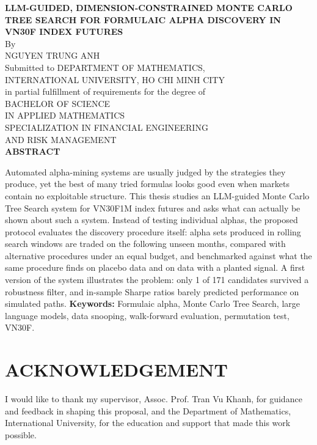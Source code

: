 \documentclass[12pt,a4paper,oneside]{book}
\theoremstyle{definition}
\newcommand{\thesistitle}{LLM-GUIDED, DIMENSION-CONSTRAINED MONTE CARLO TREE SEARCH FOR FORMULAIC ALPHA DISCOVERY IN VN30F INDEX FUTURES}
\newcommand{\studentname}{NGUYEN TRUNG ANH}
\begin{document}
	\newpage
	\thispagestyle{plain}
	\begin{center}
		\large\textbf{\thesistitle} \\
		\normalsize{By}\\
		\large{\studentname}\\
		\vskip10mm
		\normalsize{Submitted to DEPARTMENT OF MATHEMATICS,\\INTERNATIONAL UNIVERSITY, HO CHI MINH CITY\\ in partial fulfillment of requirements for the degree of\\
			BACHELOR OF SCIENCE \\
			IN APPLIED MATHEMATICS \\
			SPECIALIZATION IN FINANCIAL ENGINEERING  \\
			AND RISK MANAGEMENT}\\
		\vspace*{0.5cm}
	\large\textbf{ABSTRACT}\\
	\end{center}
	\vskip2mm
Automated alpha-mining systems are usually judged by the strategies they produce, yet the best of many tried formulas looks good even when markets contain no exploitable structure. This thesis studies an LLM-guided Monte Carlo Tree Search system for VN30F1M index futures and asks what can actually be shown about such a system. Instead of testing individual alphas, the proposed protocol evaluates the discovery procedure itself: alpha sets produced in rolling search windows are traded on the following unseen months, compared with alternative procedures under an equal budget, and benchmarked against what the same procedure finds on placebo data and on data with a planted signal. A first version of the system illustrates the problem: only 1 of 171 candidates survived a robustness filter, and in-sample Sharpe ratios barely predicted performance on simulated paths.
\vskip10mm
\textbf{Keywords:} Formulaic alpha, Monte Carlo Tree Search, large language models, data snooping, walk-forward evaluation, permutation test, VN30F.

\newpage
\clearpage
\chapter*{ACKNOWLEDGEMENT}

I would like to thank my supervisor, Assoc. Prof. Tran Vu Khanh, for guidance and feedback in shaping this proposal, and the Department of Mathematics, International University, for the education and support that made this work possible.
\end{document}
